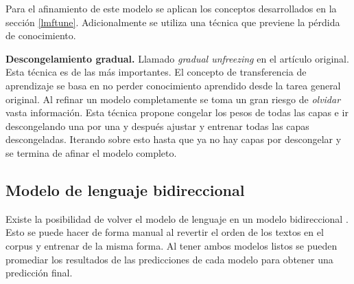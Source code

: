 Para el afinamiento de este modelo se aplican los conceptos desarrollados en la sección \ref{lmftune}. Adicionalmente se utiliza una técnica que previene la pérdida de conocimiento.

\textbf{Descongelamiento gradual.} Llamado \emph{gradual unfreezing} en el artículo original. Esta técnica es de las más importantes. El concepto de transferencia de aprendizaje se basa en no perder conocimiento aprendido desde la tarea general original. Al refinar un modelo completamente se toma un gran riesgo de \emph{olvidar} vasta información. Esta técnica propone congelar los pesos de todas las capas e ir descongelando una por una y después ajustar y entrenar todas las capas descongeladas. Iterando sobre esto hasta que ya no hay capas por descongelar y se termina de afinar el modelo completo.

\subsection{Modelo de lenguaje bidireccional}

Existe la posibilidad de volver el modelo de lenguaje en un modelo bidireccional \parencite{howard2018}. Esto se puede hacer de forma manual al revertir el orden de los textos en el corpus y entrenar de la misma forma. Al tener ambos modelos listos se pueden promediar los resultados de las predicciones de cada modelo para obtener una predicción final.


